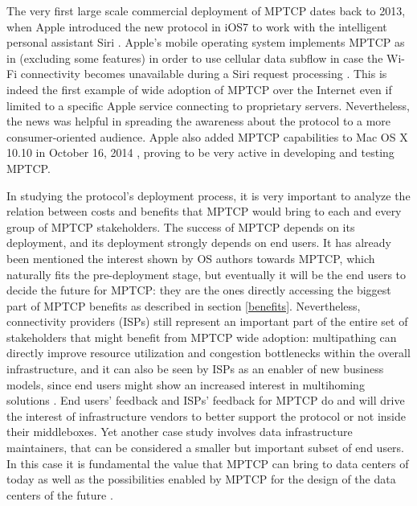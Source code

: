 The very first large scale commercial deployment of MPTCP dates back to 2013, when Apple introduced the new protocol in iOS7 to work with the intelligent personal assistant Siri \cite{apple}. Apple's mobile operating system implements MPTCP as in  \cite{rfc6824} (excluding some features) in order to use cellular data subflow in case the Wi-Fi connectivity becomes unavailable during a Siri request processing \cite{apple}. This is indeed the first example of wide adoption of MPTCP over the Internet even if limited to a specific Apple service connecting to proprietary servers. Nevertheless, the news was helpful in spreading the awareness about the protocol to a more consumer-oriented audience. Apple also added MPTCP capabilities to Mac OS X 10.10 in October 16, 2014 \cite{osx}, proving to be very active in developing and testing MPTCP.

In studying the protocol's deployment process, it is very important to analyze the relation between costs and benefits that MPTCP would bring to each and every group of MPTCP stakeholders.
The success of MPTCP depends on its deployment, and its deployment strongly depends on end users. It has already been mentioned the interest shown by OS authors towards MPTCP, which naturally fits the pre-deployment stage, but eventually it will be the end users to decide the future for MPTCP: they are the ones directly accessing the biggest part of MPTCP benefits as described in section \ref{benefits}. Nevertheless, connectivity providers (ISPs) still represent an important part of the entire set of stakeholders that might benefit from MPTCP wide adoption: multipathing can directly improve resource utilization and congestion bottlenecks within the overall infrastructure, and it can also be seen by ISPs as an enabler of new business models, since end users might show an increased interest in multihoming solutions \cite{DBLP:conf/fia/2010}. End users' feedback and ISPs' feedback for MPTCP do and will drive the interest of infrastructure vendors to better support the protocol or not inside their middleboxes.
Yet another case study involves data infrastructure maintainers, that can be considered a smaller but important subset of end users. In this case it is fundamental the value that MPTCP can bring to data centers of today as well as the possibilities enabled by MPTCP for the design of the data centers of the future \cite{Raiciu:2011:IDP:2043164.2018467}.

